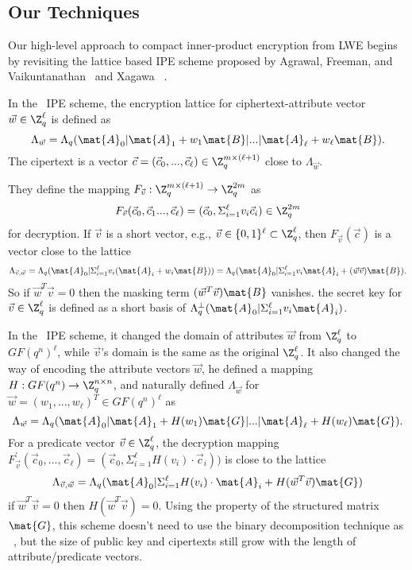 \subsection{Our Techniques}
Our high-level approach to compact inner-product encryption from LWE begins by revisiting the lattice based IPE scheme proposed by Agrawal, Freeman, and Vaikuntanathan~ \cite{AC:AgrFreVai11} and Xagawa~ \cite{PKC:Xagawa13}.\

In the~ \cite{AC:AgrFreVai11} IPE scheme, the encryption lattice for ciphertext-attribute vector $\vec{w} \in \Z^{\ell}_{q}$ is defined as
$$\Lambda_{\vec{w}}=\Lambda_{q}(\mat{A}_{0}|\mat{A}_{1}+w_{1}\mat{B}|...|\mat{A}_{\ell}+w_{\ell}\mat{B}).$$
The cipertext is a vector $\vec{c}=(\vec{c}_{0},...,\vec{c}_{\ell}) \in \Z^{m \times (\ell+1)}_{q}$ close to $\Lambda_{\vec{w}}$.\

They define the mapping $F_{\vec{v}}: \Z^{m \times (\ell+1)}_{q} \rightarrow \Z^{2m}_{q}$ as
$$ F_{\vec{v}}(\vec{c}_{0},\vec{c}_{1}...,\vec{c}_{\ell})=(\vec{c}_{0},\Sigma^{\ell}_{i=1}v_{i}\vec{c}_{i})\in \Z^{2m}_{q}$$
for decryption. If $\vec{v}$ is a short vector, e.g., $\vec{v}\in \{0,1\}^{\ell} \subset \Z^{\ell}_{q}$, then $F_{\vec{v}}(\vec{c})$ is a vector close to the lattice
$$ \Lambda_{\vec{v},\vec{w}}=\Lambda_{q}(\mat{A}_{0}|\Sigma^{\ell}_{i=1}v_{i}(\mat{A}_{i}+w_{i}\mat{B}))=\Lambda_{q}(\mat{A}_{0}|\Sigma^{\ell}_{i=1}v_{i}\mat{A}_{i}+(\vec{w}\vec{v})\mat{B}). $$
So if $\vec{w}^{T}\vec{v}=0$ then the masking term $(\vec{w}^{T}\vec{v})\mat{B}$ vanishes. the secret key for $\vec{v}\in \Z^{\ell}_{q}$ is defined as a short basis of $\Lambda^{\perp}_{q}(\mat{A}_{0}|\Sigma^{\ell}_{i=1}v_{i}\mat{A}_{i})$.\

In the~ \cite{PKC:Xagawa13} IPE scheme, it changed the domain of attributes $\vec{w}$ from $\Z^{\ell}_{q}$ to $GF(q^{n})^{\ell}$, while $\vec{v}$'s domain is the same as the original $\Z^{\ell}_{q}$. It also changed the way of encoding the attribute vectors $\vec{w}$, he defined a mapping $H: GF(q^{n})\rightarrow \Z^{n\times n}_{q}$, and naturally defined $\Lambda_{\vec{w}}$ for $\vec{w}=(w_{1},...,w_{\ell})^{T}\in GF(q^{n})^{\ell}$ as
$$ \Lambda_{\vec{w}}=\Lambda_{q}(\mat{A}_{0}|\mat{A}_{1}+H(w_{1})\mat{G}|...|\mat{A}_{\ell}+H(w_{\ell})\mat{G}).$$
For a predicate vector $\vec{v}\in \Z^{\ell}_{q}$,  the decryption mapping $F^{'}_{\vec{v}}(\vec{c}_{0},...,\vec{c}_{\ell})=(\vec{c}_{0},\Sigma^{\ell}_{i=1}H(v_{i})\cdot \vec{c}_{i}))$ is close to the lattice
$$ \Lambda_{\vec{v},\vec{w}}=\Lambda_{q}(\mat{A}_{0}|\Sigma^{\ell}_{i=1}H(v_{i})\cdot \mat{A}_{i}+H(\vec{w}^{T}\vec{v})\mat{G}) $$
if $\vec{w}^{T}\vec{v}=0$ then $H(\vec{w}^{T}\vec{v})=0$. Using the property of the structured matrix $\mat{G}$, this scheme doesn't need to use the binary decomposition technique as ~\cite{AC:AgrFreVai11}, but the size of public key and cipertexts still grow with the length of attribute/predicate vectors.

